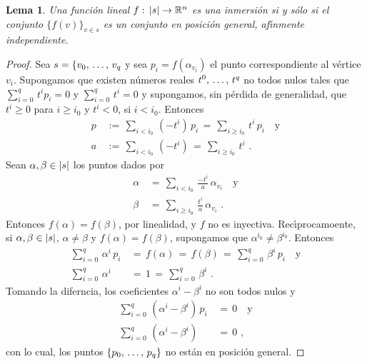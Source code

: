 \theoremstyle{plain}
\newtheorem{lemaInmersionDeUnSimplice}{Lema}[section]
\newtheorem{lemaLocalmenteFinitoLocalmenteFinito}[lemaInmersionDeUnSimplice]%
	{Lema}
\newtheorem{teoEquivalenciasLocalmenteFinito}[lemaInmersionDeUnSimplice]%
	{Teorema}
\newtheorem{teoInmersionDeUnComplejo}[lemaInmersionDeUnSimplice]{Teorema}

\theoremstyle{remark}


\begin{lemaInmersionDeUnSimplice}\label{thm:inmersiondeunsimplice}
	Una funci\'{o}n lineal $f:\,\left|s\right|\rightarrow\mathbb{R}^{n}$ es una
	inmersi\'{o}n si y s\'{o}lo si el conjunto $\{f(v)\}_{v\in s}$
	es un conjunto en posici\'{o}n general, af\'{\i}nmente independiente.
\end{lemaInmersionDeUnSimplice}

\begin{proof}
	Sea $s=\{\lista[0]{v}{q}$ y sea $p_{i}=f(\alpha_{v_{i}})$ el punto
	correspondiente al v\'{e}rtice $v_{i}$. Supongamos que existen
	n\'{u}meros reales $\lista*[0]{t}{q}$ no todos nulos tales que
	$\sum_{i=0}^{q}\,t^{i}p_{i}=0$ y $\sum_{i=0}^{q}\,t^{i}=0$ y
	supongamos, sin p\'{e}rdida de generalidad, que $t^{i}\geq 0$ para
	$i\geq i_{0}$ y $t^{i}<0$, si $i<i_{0}$. Entonces
	\begin{align*}
		p & \,:=\,\sum_{i<i_{0}}\,(-t^{i})\,p_{i} \,=\,
			\sum_{i\geq i_{0}}\,t^{i}\,p_{i} \quad\text{y} \\
		a & \,:=\,\sum_{i<i_{0}}\,(-t^{i}) \,=\,
			\sum_{i\geq i_{0}}\,t^{i}
		\text{ .}
	\end{align*}
	Sean $\alpha,\beta\in\left|s\right|$ los puntos dados por
	\begin{align*}
		\alpha & \,=\,\sum_{i<i_{0}}\,\frac{-t^{i}}{a}\,
				\alpha_{v_{i}} \quad\text{y} \\
		\beta & \,=\,\sum_{i\geq i_{0}}\,\frac{t^{i}}{a}\,
				\alpha_{v_{i}}
		\text{ .}
	\end{align*}
	Entonces $f(\alpha)=f(\beta)$, por linealidad, y $f$ no es inyectiva.
	Rec\'{\i}procamoente, si $\alpha,\beta\in\left|s\right|$,
	$\alpha\not=\beta$ y $f(\alpha)=f(\beta)$, supongamos que
	$\alpha^{i_{0}}\not=\beta^{i_{0}}$. Entonces
	\begin{align*}
		\sum_{i=0}^{q}\,\alpha^{i}\,p_{i} & \,=\,f(\alpha) \,=\,
			f(\beta) \,=\,\sum_{i=0}^{q}\,\beta^{i}\,p_{i}
			\quad\text{y} \\
		\sum_{i=0}^{q}\,\alpha^{i} & \,=\,1\,=\,
			\sum_{i=0}^{q}\,\beta^{i}
		\text{ .}
	\end{align*}
	Tomando la diferncia, los coeficientes $\alpha^{i}-\beta^{i}$ no son
	todos nulos y
	\begin{align*}
		\sum_{i=0}^{q}\,(\alpha^{i}-\beta^{i})\,p_{i} & \,=\,0
			\quad\text{y} \\
		\sum_{i=0}^{q}\,(\alpha^{i}-\beta^{i}) & \,=\,0
		\text{ ,}
	\end{align*}
	con lo cual, los puntos $\{\lista[0]{p}{q}\}$ no est\'{a}n en
	posici\'{o}n general.
\end{proof}

